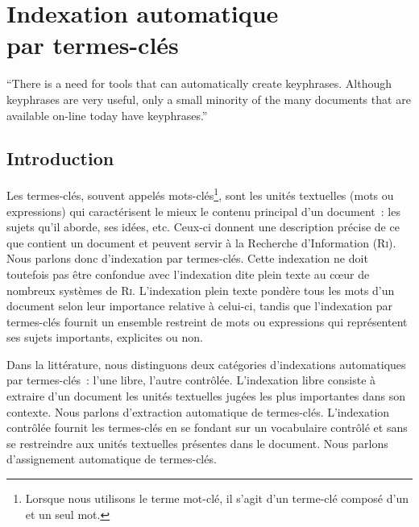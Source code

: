 \chapter[Indexation automatique par termes-clés]{Indexation automatique\\par termes-clés}
\label{part:main-state_of_the_art}
  \epigraph{
    {\Large``}There is a need for tools that can automatically create
    keyphrases. Although keyphrases are very useful, only a small minority of
    the many documents that are available on-line today have
    keyphrases.{\Large''}
  }{
  }

  \section{Introduction}
  \label{sec:main-state_of_the_art-introduction}
    Les termes-clés,
    souvent appelés mots-clés\footnote{Lorsque nous utilisons le terme
    \og{}mot-clé\fg{}, il s'agit d'un terme-clé composé d'un et un seul mot.},
    sont les unités textuelles (mots ou expressions) qui caractérisent le mieux
    le contenu principal d'un document~: les sujets qu'il aborde, ses idées,
    etc. Ceux-ci donnent une description précise de ce que contient un document
    et peuvent servir à la Recherche d'Information (\textsc{Ri}). Nous parlons
    donc d'indexation par termes-clés. Cette indexation ne doit toutefois pas être confondue
    avec l'indexation dite \og{}plein texte\fg{} au c\oe{}ur de nombreux
    systèmes de \textsc{Ri}. L'indexation plein texte pondère tous les mots d'un
    document selon leur importance relative à celui-ci, tandis que l'indexation
    par termes-clés fournit un ensemble restreint de mots ou expressions qui
    représentent ses sujets importants, explicites ou non.

    Dans la littérature, nous distinguons deux catégories d'indexations
    automatiques par termes-clés~: l'une libre, l'autre contrôlée. L'indexation
    libre consiste à extraire d'un document les unités textuelles
    jugées les plus importantes dans son contexte. Nous parlons d'extraction
    automatique de termes-clés. L'indexation contrôlée fournit les termes-clés en se fondant sur un vocabulaire
    contrôlé et sans se restreindre aux unités textuelles présentes dans le
    document. Nous parlons d'assignement automatique de
    termes-clés.

